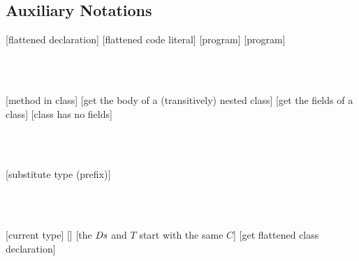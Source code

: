 \subsection{Auxiliary Notations}
\begin{grammar}
	\produ{\DF}{\cd{\id}{\LF}}[flattened declaration]
	[flattened code literal]
	[program]
	[program]
\end{grammar}
\\\\
\begin{defs}
	[method in class]
	[get the body of a (transitively) nested class]
	[get the fields of a class]
	[class has no fields]
\end{defs}
\\\\
\begin{defs}
	[substitute type (prefix)]
\end{defs}
\\\\
\begin{defs}
	[current type]
	\color{Blue} []
	[the $\mathit{Ds}$ and $T$ start with the same $C$]
	[get flattened class declaration]
\end{defs}
